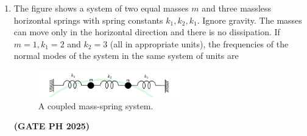 \documentclass[14pt, a4paper]{extarticle}
\begin{document}
\begin{enumerate}[label=\textbf{Q.\arabic*}]
\item The figure shows a system of two equal masses $m$ and three massless horizontal springs with spring constants $k_1, k_2, k_1$. Ignore gravity. The masses can move only in the horizontal direction and there is no dissipation. If $m=1, k_1=2$ and $k_2=3$ (all in appropriate units), the frequencies of the normal modes of the system in the same system of units are
\begin{figure}[H]
\centering
\includegraphics[width=0.6\textwidth]{figs/q38fig25.png}
\caption{A coupled mass-spring system.}
\label{fig:q38_mass_spring}
\end{figure}
\begin{enumerate}
\end{enumerate}
\hfill \textbf{(GATE PH 2025)}


\end{enumerate}
\end{document}
